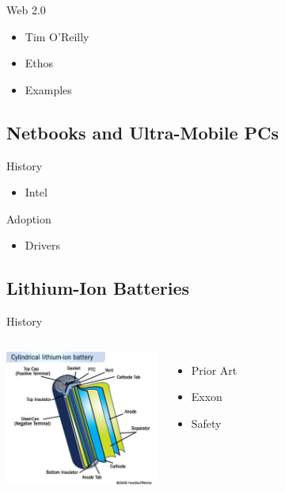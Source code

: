 \documentclass{beamer}
\begin{document}
\begin{frame}{Web 2.0}
  \begin{itemize}
  \item Tim O'Reilly
  \item Ethos
  \item Examples
  \end{itemize}
\end{frame}

\subsection{Netbooks and Ultra-Mobile PCs}

\begin{frame}{History}
  \begin{itemize}
  \item Intel %
  \end{itemize}
\end{frame}

\begin{frame}{Adoption}
  \begin{itemize}
  \item Drivers
  \end{itemize}
\end{frame}

\subsection{Lithium-Ion Batteries}

\begin{frame}{History}
  \begin{columns}
    \column{5cm}
      \includegraphics[width=5cm]{lionSummary.jpg}
    \column{5cm}
      \begin{itemize}
      \item Prior Art
      \item Exxon %
      \item Safety
      \end{itemize}
  \end{columns}
\end{frame}
\end{document}
